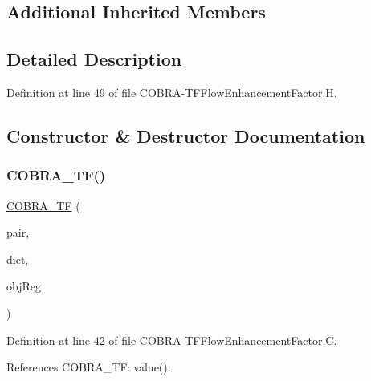 \subsection*{Additional Inherited Members}


\subsection{Detailed Description}


Definition at line 49 of file C\+O\+B\+R\+A-\/\+T\+F\+Flow\+Enhancement\+Factor.\+H.



\subsection{Constructor \& Destructor Documentation}
\mbox{\label{classFoam_1_1flowEnhancementFactorModels_1_1COBRA__TF_a1eeaa50c15bead60cd3783cdf049cc34}} 
\subsubsection{\texorpdfstring{C\+O\+B\+R\+A\+\_\+\+T\+F()}{COBRA\_TF()}}
{\footnotesize\ttfamily \hyperlink{classFoam_1_1flowEnhancementFactorModels_1_1COBRA__TF}{C\+O\+B\+R\+A\+\_\+\+TF} (\begin{DoxyParamCaption}\item[{const \hyperlink{classFoam_1_1FSPair}{F\+S\+Pair} \&}]{pair,  }\item[{const dictionary \&}]{dict,  }\item[{const object\+Registry \&}]{obj\+Reg }\end{DoxyParamCaption})}



Definition at line 42 of file C\+O\+B\+R\+A-\/\+T\+F\+Flow\+Enhancement\+Factor.\+C.



References C\+O\+B\+R\+A\+\_\+\+T\+F\+::value().

